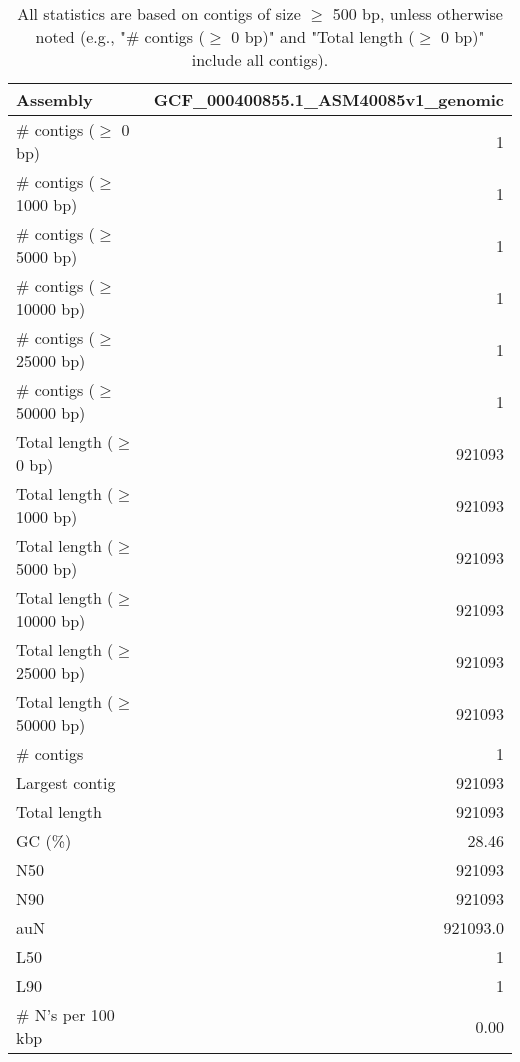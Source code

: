 \documentclass[12pt,a4paper]{article}
\begin{document}
\begin{table}[ht]
\begin{center}
\caption{All statistics are based on contigs of size $\geq$ 500 bp, unless otherwise noted (e.g., "\# contigs ($\geq$ 0 bp)" and "Total length ($\geq$ 0 bp)" include all contigs).}
\begin{tabular}{|l*{1}{|r}|}
\hline
Assembly & GCF\_000400855.1\_ASM40085v1\_genomic \\ \hline
\# contigs ($\geq$ 0 bp) & 1 \\ \hline
\# contigs ($\geq$ 1000 bp) & 1 \\ \hline
\# contigs ($\geq$ 5000 bp) & 1 \\ \hline
\# contigs ($\geq$ 10000 bp) & 1 \\ \hline
\# contigs ($\geq$ 25000 bp) & 1 \\ \hline
\# contigs ($\geq$ 50000 bp) & 1 \\ \hline
Total length ($\geq$ 0 bp) & 921093 \\ \hline
Total length ($\geq$ 1000 bp) & 921093 \\ \hline
Total length ($\geq$ 5000 bp) & 921093 \\ \hline
Total length ($\geq$ 10000 bp) & 921093 \\ \hline
Total length ($\geq$ 25000 bp) & 921093 \\ \hline
Total length ($\geq$ 50000 bp) & 921093 \\ \hline
\# contigs & 1 \\ \hline
Largest contig & 921093 \\ \hline
Total length & 921093 \\ \hline
GC (\%) & 28.46 \\ \hline
N50 & 921093 \\ \hline
N90 & 921093 \\ \hline
auN & 921093.0 \\ \hline
L50 & 1 \\ \hline
L90 & 1 \\ \hline
\# N's per 100 kbp & 0.00 \\ \hline
\end{tabular}
\end{center}
\end{table}
\end{document}
